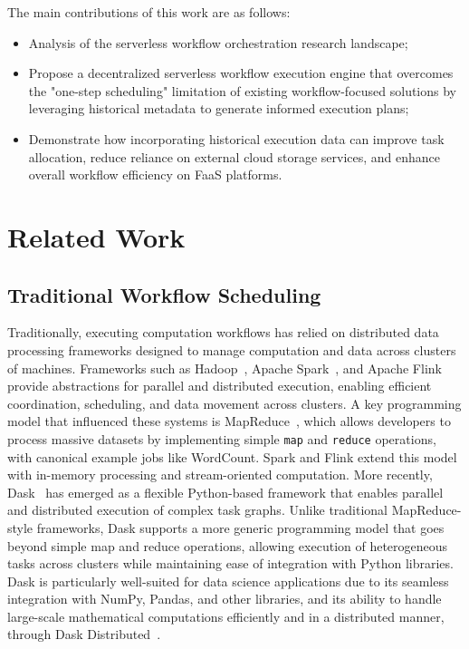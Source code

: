 \documentclass[conference]{IEEEtran}
\begin{document}
The main contributions of this work are as follows:
\begin{itemize}
    \item Analysis of the serverless workflow orchestration research landscape;
    \item Propose a decentralized serverless workflow execution engine that overcomes the "one-step scheduling" limitation of existing workflow-focused solutions by leveraging historical metadata to generate informed execution plans;
    \item Demonstrate how incorporating historical execution data can improve task allocation, reduce reliance on external cloud storage services, and enhance overall workflow efficiency on FaaS platforms.
\end{itemize}


\section{Related Work}
\label{s:related_work}


\subsection{Traditional Workflow Scheduling}
Traditionally, executing computation workflows has relied on distributed data processing frameworks designed to manage computation and data across clusters of machines. Frameworks such as Hadoop~\cite{apache_hadoop}, Apache Spark~\cite{apache_spark}, and Apache Flink~\cite{apache_flink} provide abstractions for parallel and distributed execution, enabling efficient coordination, scheduling, and data movement across clusters. A key programming model that influenced these systems is MapReduce~\cite{mapreduce}, which allows developers to process massive datasets by implementing simple \texttt{map} and \texttt{reduce} operations, with canonical example jobs like WordCount. Spark and Flink extend this model with in-memory processing and stream-oriented computation. More recently, Dask~\cite{dask_python} has emerged as a flexible Python-based framework that enables parallel and distributed execution of complex task graphs. Unlike traditional MapReduce-style frameworks, Dask supports a more generic programming model that goes beyond simple map and reduce operations, allowing execution of heterogeneous tasks across clusters while maintaining ease of integration with Python libraries. Dask is particularly well-suited for data science applications due to its seamless integration with NumPy, Pandas, and other libraries, and its ability to handle large-scale mathematical computations efficiently and in a distributed manner, through Dask Distributed~\cite{dask_python_distributed}.
\end{document}

